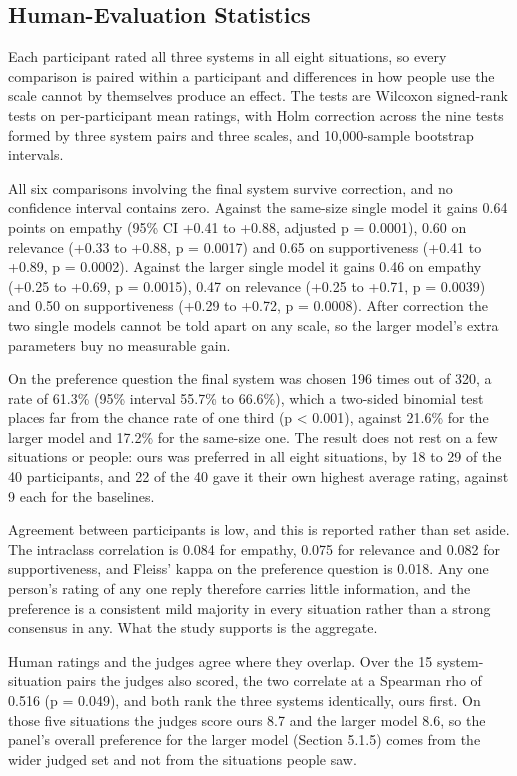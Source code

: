 \subsection{Human-Evaluation Statistics}
\label{sec:5.4.6}

Each participant rated all three systems in all eight situations, so every comparison is paired within a participant and differences in how people use the scale cannot by themselves produce an effect. The tests are Wilcoxon signed-rank tests on per-participant mean ratings, with Holm correction across the nine tests formed by three system pairs and three scales, and 10,000-sample bootstrap intervals.

All six comparisons involving the final system survive correction, and no confidence interval contains zero. Against the same-size single model it gains 0.64 points on empathy (95\% CI +0.41 to +0.88, adjusted p = 0.0001), 0.60 on relevance (+0.33 to +0.88, p = 0.0017) and 0.65 on supportiveness (+0.41 to +0.89, p = 0.0002). Against the larger single model it gains 0.46 on empathy (+0.25 to +0.69, p = 0.0015), 0.47 on relevance (+0.25 to +0.71, p = 0.0039) and 0.50 on supportiveness (+0.29 to +0.72, p = 0.0008). After correction the two single models cannot be told apart on any scale, so the larger model's extra parameters buy no measurable gain.

On the preference question the final system was chosen 196 times out of 320, a rate of 61.3\% (95\% interval 55.7\% to 66.6\%), which a two-sided binomial test places far from the chance rate of one third (p < 0.001), against 21.6\% for the larger model and 17.2\% for the same-size one. The result does not rest on a few situations or people: ours was preferred in all eight situations, by 18 to 29 of the 40 participants, and 22 of the 40 gave it their own highest average rating, against 9 each for the baselines.

Agreement between participants is low, and this is reported rather than set aside. The intraclass correlation is 0.084 for empathy, 0.075 for relevance and 0.082 for supportiveness, and Fleiss' kappa on the preference question is 0.018. Any one person's rating of any one reply therefore carries little information, and the preference is a consistent mild majority in every situation rather than a strong consensus in any. What the study supports is the aggregate.

Human ratings and the judges agree where they overlap. Over the 15 system-situation pairs the judges also scored, the two correlate at a Spearman rho of 0.516 (p = 0.049), and both rank the three systems identically, ours first. On those five situations the judges score ours 8.7 and the larger model 8.6, so the panel's overall preference for the larger model (Section 5.1.5) comes from the wider judged set and not from the situations people saw.

